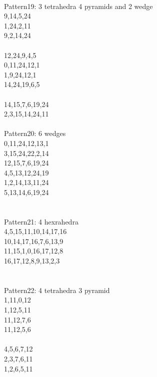 \documentclass[twocolumn]{article}
\begin{document}
 \\
\tiny  Pattern19: 3 tetrahedra 4 pyramids and 2 wedge\\
\tiny  9,14,5,24 \\
\tiny  1,24,2,11 \\
\tiny  9,2,14,24 \\
\tiny   \\
\tiny  12,24,9,4,5 \\
\tiny  0,11,24,12,1 \\
\tiny  1,9,24,12,1 \\
\tiny  14,24,19,6,5 \\
\tiny   \\
\tiny  14,15,7,6,19,24 \\
\tiny  2,3,15,14,24,11 \\

 \\
\tiny  Pattern20: 6 wedges\\
\tiny  0,11,24,12,13,1 \\
\tiny  3,15,24,22,2,14  \\
\tiny  12,15,7,6,19,24 \\
\tiny  4,5,13,12,24,19 \\
\tiny  1,2,14,13,11,24 \\
\tiny  5,13,14,6,19,24 \\
\tiny   \\

 \\
\tiny  Pattern21: 4 hexrahedra \\
\tiny  4,5,15,11,10,14,17,16 \\
\tiny  10,14,17,16,7,6,13,9 \\
\tiny  11,15,1,0,16,17,12,8 \\
\tiny  16,17,12,8,9,13,2,3 \\
\tiny   \\

 \\
\tiny  Pattern22: 4 tetrahedra 3 pyramid \\
\tiny  1,11,0,12 \\
\tiny  1,12,5,11 \\
\tiny  11,12,7,6 \\
\tiny  11,12,5,6 \\
\tiny   \\
\tiny  4,5,6,7,12 \\
\tiny  2,3,7,6,11 \\
\tiny  1,2,6,5,11 \\
\end{document}
